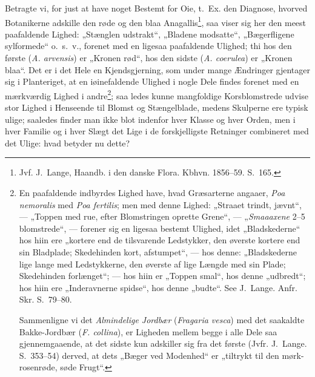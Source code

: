 \documentclass[11pt]{book}
\newcommand{\opage}[1]{\marginnote{\footnotesize\textit{[#1]}}}
\begin{document}
Betragte vi, for just at have noget Bestemt for Oie, t.~Ex. den Diagnose,
hvorved Botanikerne adskille den røde og den blaa Anagallis\footnote{Jvf.
J.~Lange, Haandb. i den danske Flora. Kbhvn. 1856--59. S.~165.}, saa viser
sig her den meest paafaldende Lighed: „Stænglen udstrakt“, „Bladene
modsatte“, „Bægerfligene sylformede“ o.~s.~v., forenet med en ligesaa
paafaldende Ulighed; thi hos den første (\textit{A. arvensis}) er „Kronen
rød“, hos den sidste (\textit{A. coerulea}) er „Kronen blaa“. Det er i det
Hele en Kjendsgjerning, som under mange Ændringer gjentager sig i
Planteriget, at en iøinefaldende Ulighed i nogle Dele findes forenet med en
mærkværdig Lighed i andre\footnote{En paafaldende indbyrdes Lighed have,
hvad Græsarterne angaaer, \textit{Poa nemoralis} med \textit{Poa fertilis};
men med denne Lighed: „Straaet trindt, jævnt“, --- „Toppen med rue, efter
Blomstringen oprette Grene“, --- „\emph{Smaaaxene} 2--5 blomstrede“, ---
forener sig en ligesaa bestemt Ulighed, idet „Bladskederne“ hos hiin ere
„kortere end de tilsvarende Ledstykker, den øverste kortere end sin
Bladplade; Skedehinden kort, afstumpet“, --- hos denne: „Bladskederne lige
lange med Ledstykkerne, den øverste af lige Længde med sin Plade;
Skedehinden forlænget“; --- hos hiin er „Toppen smal“, hos denne „udbredt“;
hos hiin ere „Inderavnerne spidse“, hos denne „budte“. See J.~Lange. Anfr.
Skr. S.~79--80.

Sammenligne vi det \emph{Almindelige Jordbær} (\textit{Fragaria vesca}) med
det saakaldte Bakke-Jordbær (\textit{F. collina}), er Ligheden mellem begge
i alle Dele saa gjennemgaaende, at det sidste kun adskiller sig fra det
første (Jvfr. J.~Lange. S.~353--54) derved, at dets „Bæger ved Modenhed“ er
„tiltrykt til den mørk-rosenrøde, søde Frugt“.}; saa\-%
\opage{310} \setcounter{footnote}{0}%
ledes kunne mangfoldige Korsblomstrede udvise stor Lighed i Henseende til
Blomst og Stængelblade, medens Skulperne ere typisk ulige; saaledes finder
man ikke blot indenfor hver Klasse og hver Orden, men i hver Familie og i
hver Slægt det Lige i de forskjelligste Retninger combineret med det Ulige:
hvad betyder nu dette?
\end{document}
